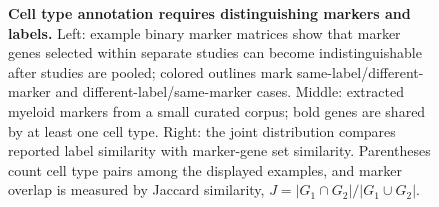 \begin{figure}[t]
\centering
\resizebox{\textwidth}{!}{%
}
\caption{\textbf{Cell type annotation requires distinguishing markers and labels.} Left: example binary marker matrices show that marker genes selected within separate studies can become indistinguishable after studies are pooled; colored outlines mark same-label/different-marker and different-label/same-marker cases. Middle: extracted myeloid markers  from a small curated corpus; bold genes are shared by at least one cell type. Right: the joint distribution compares reported label similarity with marker-gene set similarity. Parentheses count cell type pairs among the displayed examples, and marker overlap is measured by Jaccard similarity, $J=|G_1\cap G_2|/|G_1\cup G_2|$.}
\label{fig:paper_celltype_joint}
%
%
\end{figure}
